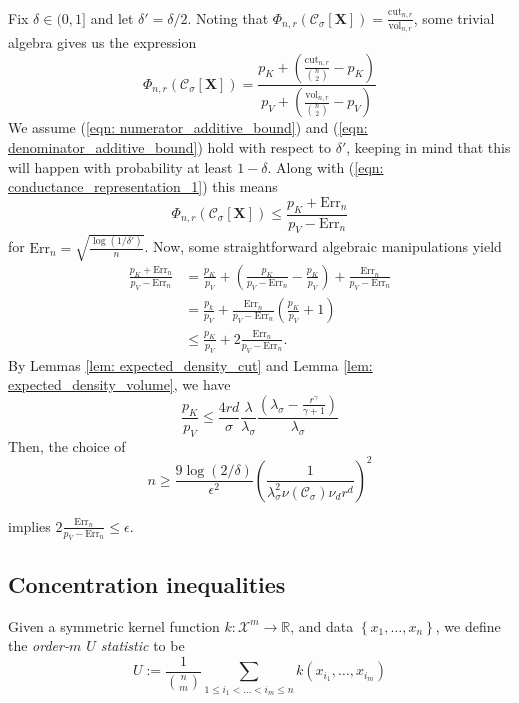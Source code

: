 \documentclass{article}
\newcommand{\set}[1]{\left\{#1\right\}}
\newcommand{\vol}{\mathrm{vol}}
\newcommand{\Reals}{\mathbb{R}}
\newcommand{\1}{\mathbf{1}}
\newcommand{\Err}{\mathrm{Err}}
\newcommand{\cut}{\mathrm{cut}}
\newcommand{\Xbf}{\mathbf{X}}
\newcommand{\Cset}{\mathcal{C}}
\newcommand{\Csig}{\Cset_{\sigma}}
\theoremstyle{aldenthm}
\begin{document}
Fix $\delta \in (0,1]$ and let $\delta' = \delta/2$. Noting that $\Phi_{n,r}(\Csig[\Xbf]) = \frac{\cut_{n,r}}{\vol_{n,r}}$, some trivial algebra gives us the expression
\begin{equation}
\label{eqn: conductance_representation_1}
\Phi_{n,r}(\Csig[\Xbf]) = \frac{p_K + \left(\frac{\cut_{n,r}}{{n \choose 2}} - p_K\right)}{p_V + \left(\frac{\vol_{n,r}}{{n \choose 2}} - p_V\right)}
\end{equation}
We assume (\ref{eqn: numerator_additive_bound}) and (\ref{eqn: denominator_additive_bound}) hold with respect to $\delta'$, keeping in mind that this will happen with probability at least $1 - \delta$. Along with (\ref{eqn: conductance_representation_1}) this means
\begin{equation*}
\Phi_{n,r}(\Csig[\mathbf{X}]) \leq \frac{p_K + \Err_n}{p_V - \Err_n}
\end{equation*}
for $\Err_n = \sqrt{\frac{\log(1/\delta')}{n}}$.
Now, some straightforward algebraic manipulations yield
\begin{align*}
\frac{p_K + \Err_n}{p_V - \Err_n} & = \frac{p_K}{p_V} + \left(\frac{p_K}{p_V - \Err_n} - \frac{p_K}{p_V}\right) + \frac{\Err_n}{p_V - \Err_n} \\
& = \frac{p_k}{p_V} + \frac{\Err_n}{p_V - \Err_n}\left(\frac{p_K}{p_V} + 1\right) \\
& \leq \frac{p_K}{p_V} + 2 \frac{\Err_n}{p_V - \Err_n}.
\end{align*}
By Lemmas \ref{lem: expected_density_cut} and Lemma \ref{lem: expected_density_volume}, we have
\begin{equation*}
\frac{p_K}{p_V} \leq \frac{4rd}{\sigma} \frac{\lambda}{\lambda_{\sigma}} \frac{\left(\lambda_{\sigma} - \frac{r^{\gamma}}{\gamma + 1}\right)}{\lambda_{\sigma}}
\end{equation*}
Then, the choice of 
\begin{equation*}
n \geq \frac{9\log(2/\delta)}{\epsilon^2}\left(\frac{1}{ \lambda_{\sigma}^2 \nu(\Csig) \nu_d r^d}\right)^2 
\end{equation*}

implies $2 \frac{\Err_n}{p_V - \Err_n} \leq \epsilon$.


\subsection{Concentration inequalities}

Given a symmetric kernel function $k: \mathcal{X}^m \to \Reals$, and data $\set{x_1, \ldots, x_n}$, we define the \textit{order-$m$ $U$ statistic} to be 
\begin{equation*}
U := \frac{1}{ {n \choose m} } \sum_{1 \leq i_1 < \ldots < i_m \leq n} k(x_{i_1},\ldots,x_{i_m})
\end{equation*}
\end{document}

